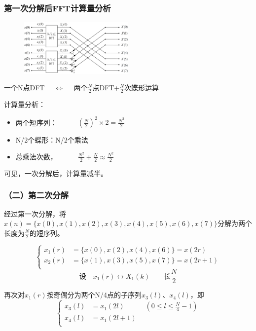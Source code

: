 \documentclass[notheorems,compress,mathserif,table]{beamer}
\begin{document}
\begin{frame}[shrink]\frametitle{第一次分解后FFT计算量分析}
\begin{figure}[h]
  \centering
  \includegraphics[width=0.5\textwidth]{8dftFirst.jpg}
\end{figure}
\par
\begin{center}
一个N点DFT $\quad\Longleftrightarrow\quad$ 两个$\frac{N}{2}$点DFT+$\frac{N}{2}$次蝶形运算
\end{center}
\par 计算量分析：
\begin{itemize}
  \item 两个短序列：$\quad\quad\quad(\frac{N}{2})^{2}\times2=\frac{N^{2}}{2}$
  \item N/2个蝶形：\quad\quad\quad N/2个乘法
  \item 总乘法次数，$\quad\quad\quad\frac{N^{2}}{2}+\frac{N}{2}\approx \frac{N^{2}}{2}$
\end{itemize}
可见，一次分解后，计算量减半。
\end{frame}
\begin{frame}[shrink]\frametitle{（二）第二次分解}%
经过第一次分解，将$x(n) = \{x(0),x(1),x(2),x(3),x(4),x(5),x(6),x(7)\}$分解为两个长度为$\frac{N}{2}$的短序列。

\begin{equation*}
\left\{ \begin{aligned}
    x_{1}(r) &= \{x(0),x(2),x(4),x(6)\}=x(2r)\\
    x_{2}(r) &= \{x(1),x(3),x(5),x(7)\}=x(2r+1)\\
\end{aligned} \right.
\end{equation*}
$$\mbox{设}\quad x_{1}(r)\longleftrightarrow X_{1}(k)\qquad\mbox{长}\frac{N}{2}$$
\par 再次对$x_{1}(r)$按奇偶分为两个N/4点的子序列$x_{3}(l)$、$x_{4}(l)$，即
$$
\left\{ \begin{aligned}
    x_3(l) &= x_{1}(2l)\quad\quad\quad(0\leq l\leq\frac{N}{4}-1) \\
    x_4(l) &= x_{1}(2l+1)\\
\end{aligned} \right.
$$

\end{frame}
\end{document}
